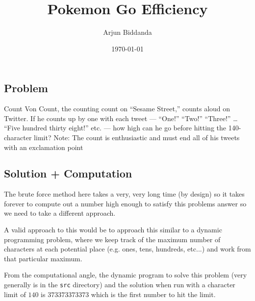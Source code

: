 \documentclass[12pt]{article}
\title{Pokemon Go Efficiency}
\author{Arjun Biddanda}
\date{\today}
\begin{document}
\maketitle
\linenumbers

\subsection*{Problem}

Count Von Count, the counting count on “Sesame Street,” counts aloud on Twitter. If he counts up by one with each tweet — “One!” “Two!” “Three!” … “Five hundred thirty eight!” etc. — how high can he go before hitting the 140-character limit? Note: The count is enthusiastic and must end all of his tweets with an exclamation point

\subsection*{Solution + Computation}

The brute force method here takes a very, very long time (by design) so it takes forever to compute out a number high enough to satisfy this problems answer so we need to take a different approach.

A valid approach to this would be to approach this similar to a dynamic programming problem, where we keep track of the maximum number of characters at each potential place (e.g. ones, tens, hundreds, etc...) and work from that particular maximum.

From the computational angle, the dynamic program to solve this problem (very generally is in the \texttt{src} directory) and the solution when run with a character limit of $140$ is $373373373373$ which is the first number to hit the limit. 
\end{document}
